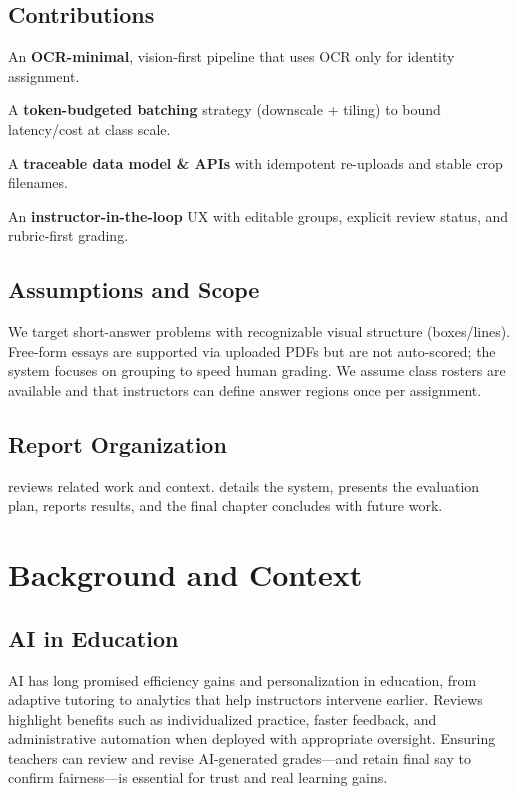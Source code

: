 \documentclass[ms,twoside,print]{nuthesis}
\begin{document}
\section{Contributions}
\begin{compactitem}
  \item An \textbf{OCR-minimal}, vision-first pipeline that uses OCR only for identity assignment.
  \item A \textbf{token-budgeted batching} strategy (downscale + tiling) to bound latency/cost at class scale.
  \item A \textbf{traceable data model \& APIs} with idempotent re-uploads and stable crop filenames.
  \item An \textbf{instructor-in-the-loop} UX with editable groups, explicit review status, and rubric-first grading.
\end{compactitem}

\section{Assumptions and Scope}
We target short-answer problems with recognizable visual structure (boxes/lines). Free-form essays are supported via uploaded PDFs but are not auto-scored; the system focuses on grouping to speed human grading. We assume class rosters are available and that instructors can define answer regions once per assignment.

\section{Report Organization}
 reviews related work and context.  details the system,  presents the evaluation plan,  reports results, and the final chapter concludes with future work.

\chapter{Background and Context}\label{chap:bg}
\section{AI in Education}
AI has long promised efficiency gains and personalization in education, from adaptive tutoring to analytics that help instructors intervene earlier. Reviews highlight benefits such as individualized practice, faster feedback, and administrative automation when deployed with appropriate oversight\cite{Alto2023,Chen2020,Luckin2016,Zawacki2019}. Ensuring teachers can review and revise AI-generated grades—and retain final say to confirm fairness—is essential for trust and real learning gains.
\end{document}
